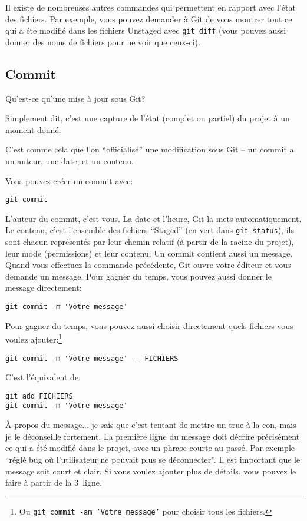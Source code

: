 \documentclass[10pt,a4paper]{article}
\begin{document}
Il existe de nombreuses autres commandes qui permettent en rapport avec l'état des fichiers. Par exemple, vous pouvez demander à Git de vous montrer tout ce qui a été modifié dans les fichiers Unstaged avec {\tt git diff} (vous pouvez aussi donner des noms de fichiers pour ne voir que ceux-ci).

\subsection{Commit}

Qu'est-ce qu'une mise à jour sous Git?

Simplement dit, c'est une capture de l'état (complet ou partiel) du projet à un moment donné.

C'est comme cela que l'on ``officialise'' une modification sous Git -- un commit a un auteur, une date, et un contenu.

Vous pouvez créer un commit avec:

\begin{verbatim}
git commit
\end{verbatim}

L'auteur du commit, c'est vous. La date et l'heure, Git la mets automatiquement. Le contenu, c'est l'ensemble des fichiers ``Staged'' (en vert dans {\tt git status}), ils sont chacun représentés par leur chemin relatif (à partir de la racine du projet), leur mode (permissions) et leur contenu. Un commit contient aussi un message. Quand vous effectuez la commande précédente, Git ouvre votre éditeur et vous demande un message. Pour gagner du temps, vous pouvez aussi donner le message directement:

\begin{verbatim}
git commit -m 'Votre message'
\end{verbatim}

Pour gagner du temps, vous pouvez aussi choisir directement quels fichiers vous voulez ajouter:\footnote{Ou \texttt{git commit -am 'Votre message'} pour choisir tous les fichiers.}

\begin{verbatim}
git commit -m 'Votre message' -- FICHIERS
\end{verbatim}

C'est l'équivalent de:

\begin{verbatim}
git add FICHIERS
git commit -m 'Votre message'
\end{verbatim}

À propos du message... je sais que c'est tentant de mettre un truc à la con, mais je le déconseille fortement. La première ligne du message doit décrire précisément ce qui a été modifié dans le projet, avec un phrase courte au passé. Par exemple ``réglé bug où l'utilisateur ne pouvait plus se déconnecter''. Il est important que le message soit court et clair. Si vous voulez ajouter plus de détails, vous pouvez le faire à partir de la 3\ieme~ligne.
\end{document}
